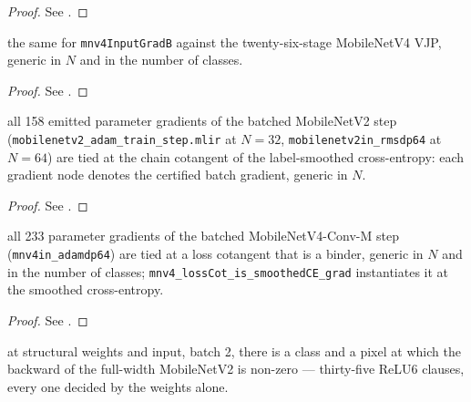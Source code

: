 \begin{proof}
\leanok
See .
\end{proof}

\begin{theorem}
  \label{thm:mobilenetv4_whole_back}
  \leanok
  \Prove{} the same for \texttt{mnv4InputGradB} against the
  twenty-six-stage MobileNetV4 VJP, generic in \(N\) and in the number of
  classes.
\end{theorem}

\begin{proof}
\leanok
See .
\end{proof}

\begin{theorem}
  \label{thm:mobilenetv2_step_tie}
  \leanok
  \Prove{} all 158 emitted parameter gradients of the batched MobileNetV2
  step (\texttt{mobilenetv2\_adam\_train\_step.mlir} at \(N = 32\),
  \texttt{mobilenetv2in\_rmsdp64} at \(N = 64\)) are tied at the chain
  cotangent of the label-smoothed cross-entropy: each gradient node denotes
  the certified batch gradient, generic in \(N\).
\end{theorem}

\begin{proof}
\leanok
See .
\end{proof}

\begin{theorem}
  \label{thm:mobilenetv4_step_tie}
  \leanok
  \Prove{} all 233 parameter gradients of the batched MobileNetV4-Conv-M
  step (\texttt{mnv4in\_adamdp64}) are tied at a loss cotangent that is a
  binder, generic in \(N\) and in the number of classes;
  \texttt{mnv4\_lossCot\_is\_smoothedCE\_grad} instantiates it at the
  smoothed cross-entropy.
\end{theorem}

\begin{proof}
\leanok
See .
\end{proof}

\begin{theorem}
  \label{thm:mobilenetv2_seal}
  \leanok
  \Prove{} at structural weights and input, batch 2, there is a class and a
  pixel at which the backward of the full-width MobileNetV2 is non-zero ---
  thirty-five ReLU6 clauses, every one decided by the weights alone.
\end{theorem}

